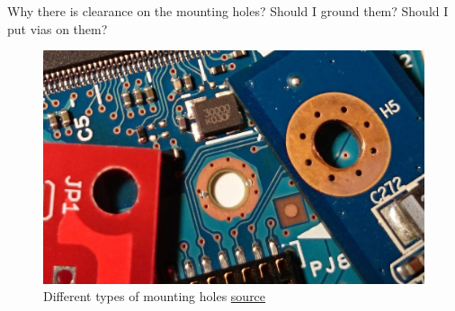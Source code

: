 \documentclass[12pt]{article}
\begin{document}
Why there is clearance on the mounting holes? Should I ground them? Should I put vias on them?

\begin{figure}[h!]
	\centering
	\includegraphics[keepaspectratio, height=.3\textheight, width = \textwidth]{assets/mounting_holes.jpg}
	\caption{Different types of mounting holes \href{https://atadiat.com/en/e-four-pcb-marks/}{source}}
\end{figure}




\end{document}
